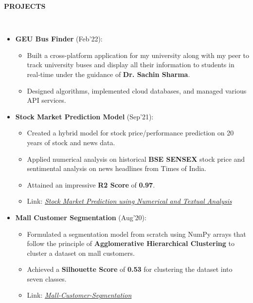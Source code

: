 \documentclass[a4paper,10pt]{article}
\newcommand{\lsep}{-0.5cm}
\newcommand{\resheading}[1]{{\small \colorbox{mygrey}{\begin{minipage}{0.98\textwidth}{\textbf{#1 \vphantom{p\^{E}}}}\end{minipage}}}}
\begin{document}
\resheading{\textbf{PROJECTS} }\\[\lsep]
\begin{itemize}[itemsep=0.01mm, parsep=0.1pt]

\item \textbf{GEU Bus Finder} (Feb'22): \\[\lsep]
\begin{itemize}[itemsep=0.01mm, parsep=2pt]
\item Built a cross-platform application for my university along with my peer to track university buses and display all their information to students in real-time under the guidance of \textbf{Dr. Sachin Sharma}.
\item Designed algorithms, implemented cloud databases, and managed various API services.
\end{itemize}

\item \textbf{Stock Market Prediction Model} (Sep'21): \\[\lsep]
\begin{itemize}[itemsep=0.01mm, parsep=2pt]
\item Created a hybrid model for stock price/performance prediction on 20 years of stock and news data.
\item Applied numerical analysis on historical \textbf{BSE SENSEX} stock price and sentimental analysis on news headlines from Times of India. 
\item Attained an impressive \textbf{R2 Score} of \textbf{0.97}.
\item Link: \href{https://github.com/Ash20vyas/TSF-Intern-Tasks/tree/main/%232%20-%20Stock%20Market%20Prediction%20using%20Numerical%20and%20Textual%20Analysis} {\textit{Stock Market Prediction using Numerical and Textual Analysis}}
\end{itemize}

\item \textbf{Mall Customer Segmentation} (Aug'20): \\[\lsep]\begin{itemize}[itemsep=0.01mm, parsep=0.01pt]
\item Formulated a segmentation model from scratch using NumPy arrays that follow the principle of \textbf{Agglomerative Hierarchical Clustering} to cluster a dataset on mall customers. 
\item Achieved a \textbf{Silhouette Score} of \textbf{0.53} for clustering the dataset into seven classes.
\item Link: \href{https://github.com/Ash20vyas/Mall-Customer-Segmentation} {\textit{Mall-Customer-Segmentation}}
\end{itemize}

\end{itemize}
\end{document}

